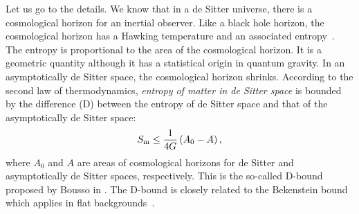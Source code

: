 \documentclass[a4paper,12pt]{article}
\begin{document}
Let us go to the details. We know that in a de Sitter universe,  there is 
a cosmological horizon for an inertial observer. Like a black hole horizon, the 
cosmological horizon has a Hawking temperature and an associated entropy~\cite{GH}. 
The entropy is proportional to the area of the cosmological horizon.
 It is a geometric quantity although it has a 
statistical origin in quantum gravity.
In an asymptotically de Sitter space, the cosmological horizon
shrinks. According to the second law of thermodynamics, {\it
entropy of matter in de Sitter space} is  bounded by the
difference (D) between the entropy of de Sitter space and that of
the asymptotically de Sitter space:
\begin{equation}
\label{2eq10}
  S_{\rm m} \le \frac{1}{4 G}\left( A_0-A\right),
\end{equation}
where $A_0$ and $A$ are areas of cosmological horizons for  de
Sitter and asymptotically de Sitter spaces, respectively. This is
the so-called D-bound proposed by Bousso in \cite{Bousso}. The
D-bound is closely related to the Bekenstein bound which applies in
flat backgrounds~\cite{Bousso,CMO}.
\end{document}
